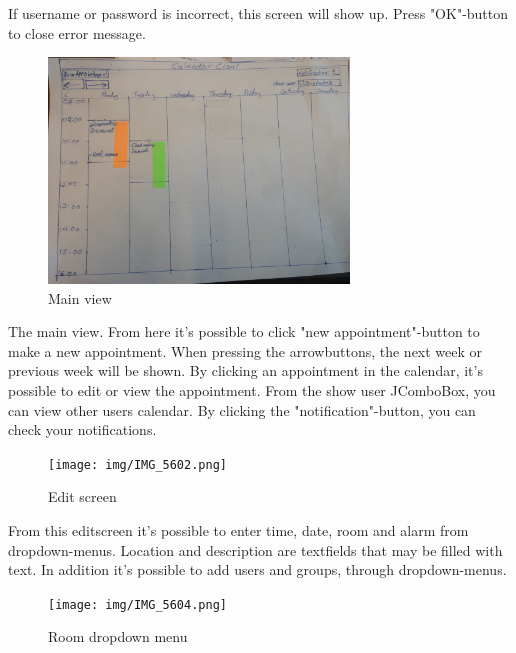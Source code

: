 \documentclass{article}
\begin{document}
If username or password is incorrect, this screen will show up. Press "OK"-button to close error message.

\newpage

\begin{figure}[h!] 
    \begin{center} 
        \includegraphics[width=8cm]{img/IMG_5601.JPG}
        \caption{Main view}
    \label{mainview}
    \end{center}
\end{figure}

The main view. From here it's possible to click "new appointment"-button to make a new appointment. When pressing the arrowbuttons, the next week or previous week will be shown. By clicking an appointment in the calendar, it's possible to edit or view the appointment. From the show user JComboBox, you can view other users calendar. By clicking the "notification"-button, you can check your notifications.

\begin{figure}[h!] 
    \begin{center} 
        \texttt{[image: img/IMG\_5602.png]}
        \caption{Edit screen}
    \label{edit}
    \end{center}
\end{figure}

From this editscreen it's possible to enter time, date, room and alarm from dropdown-menus. Location and description are textfields that may be filled with text. In addition it's possible to add users and groups, through dropdown-menus.

\newpage

\begin{figure}[h!] 
    \begin{center} 
        \texttt{[image: img/IMG\_5604.png]}
        \caption{Room dropdown menu}
    \label{roomdropdown}
    \end{center}
\end{figure}
\end{document}
